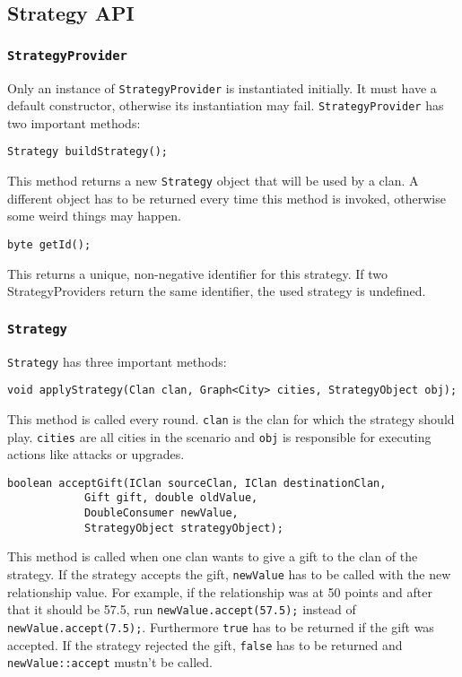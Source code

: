 \documentclass{article}
\begin{document}
    \subsection{Strategy API}

    \subsubsection{\texttt{StrategyProvider}}
    Only an instance of \texttt{StrategyProvider} is instantiated initially. It must have a default constructor, otherwise its instantiation may fail. \texttt{StrategyProvider} has two important methods:
    \begin{verbatim}
Strategy buildStrategy();
    \end{verbatim}
    This method returns a new \texttt{Strategy} object that will be used by a clan. A different object has to be returned every time this method is invoked, otherwise some weird things may happen.
    \begin{verbatim}
byte getId();
    \end{verbatim}
    This returns a unique, non-negative identifier for this strategy. If two StrategyProviders return the same identifier, the used strategy is undefined.

    \subsubsection{\texttt{Strategy}}
    \texttt{Strategy} has three important methods:
    \begin{verbatim}
void applyStrategy(Clan clan, Graph<City> cities, StrategyObject obj);
    \end{verbatim}
    This method is called every round. \texttt{clan} is the clan for which the strategy should play. \texttt{cities} are all cities in the scenario and  \texttt{obj} is responsible for executing
    actions like attacks or upgrades.
    \begin{verbatim}
boolean acceptGift(IClan sourceClan, IClan destinationClan,
			Gift gift, double oldValue,
			DoubleConsumer newValue,
			StrategyObject strategyObject);
    \end{verbatim}
    This method is called when one clan wants to give a gift to the clan of the strategy. If the strategy accepts the gift, \texttt{newValue} has to be called with the new relationship value. For example, if the relationship
    was at 50 points and after that it should be 57.5, run \texttt{newValue.accept(57.5);} instead of \texttt{newValue.accept(7.5);}. Furthermore \texttt{true} has to be returned if the gift was accepted.
    If the strategy rejected the gift, \texttt{false} has to be returned and \texttt{newValue::accept} mustn't be called.
\end{document}
